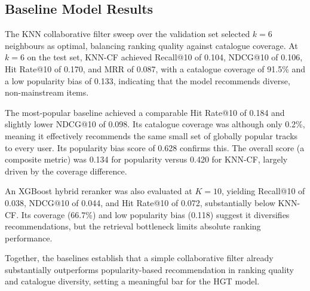 \subsection{Baseline Model Results}

The KNN collaborative filter sweep over the validation set selected $k = 6$ neighbours as optimal, balancing ranking quality against catalogue coverage. At $k = 6$ on the test set, KNN-CF achieved Recall@10 of 0.104, NDCG@10 of 0.106, Hit Rate@10 of 0.170, and MRR of 0.087, with a catalogue coverage of 91.5\% and a low popularity bias of 0.133, indicating that the model recommends diverse, non-mainstream items.

The most-popular baseline achieved a comparable Hit Rate@10 of 0.184 and slightly lower NDCG@10 of 0.098. Its catalogue coverage was although only 0.2\%, meaning it effectively recommends the same small set of globally popular tracks to every user. Its popularity bias score of 0.628 confirms this. The overall score (a composite metric) was 0.134 for popularity versus 0.420 for KNN-CF, largely driven by the coverage difference.

An XGBoost hybrid reranker was also evaluated at $K = 10$, yielding Recall@10 of 0.038, NDCG@10 of 0.044, and Hit Rate@10 of 0.072, substantially below KNN-CF. Its coverage (66.7\%) and low popularity bias (0.118) suggest it diversifies recommendations, but the retrieval bottleneck limits absolute ranking performance.

Together, the baselines establish that a simple collaborative filter already substantially outperforms popularity-based recommendation in ranking quality and catalogue diversity, setting a meaningful bar for the HGT model.